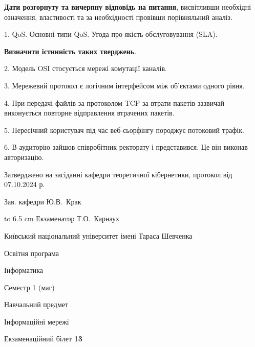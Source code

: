 \documentclass[12pt, ukrainian]{article}
\begin{document}
{
\qquad\textbf{Дати розгорнуту та вичерпну відповідь на питання}, висвітливши необхідні означення, властивості та за необхідності провівши порівняльний аналіз.

1. QoS. Основні типи QoS. Угода про якість обслуговування (SLA).



\qquad\textbf{Визначити істинність таких тверджень}.

2. Модель OSI стосується мережі комутації каналів.


3. Мережевий протокол є логічним інтерфейсом між об'єктами одного рівня.


4. При передачі файлів за протоколом TCP за втрати пакетів зазвичай виконується повторне відправлення втрачених пакетів.


5. Пересічний користувач під час веб-сьорфінгу породжує потоковий трафік.


6. В аудиторію зайшов співробітник ректорату і представився. Це він виконав авторизацію.

}
{\smallskip\smallskip \begin {scriptsize} Затверджено на засіданні кафедри теоретичної кібернетики, протокол   від   07.10.2024 р.\par\smallskip\smallskip\smallskip\smallskip
{\parbox {6.5 cm} {Зав. кафедри \dotfill Ю.В.~Крак}}\hspace {0.7cm} {\hbox to 6.5 cm { Екзаменатор \dotfill Т.О.~Карнаух}} \end{scriptsize}}
\newpage
{{\begin {scriptsize}\par
{ \center  Київський національний університет імені Тараса Шевченка \par}
{\parbox {5 cm}{Освітня програма \hfill}{\parbox {7 cm}{Інформатика\hfill}}\parbox {6 cm}{\hfill Семестр 1 (маг)}}\par
{\parbox {5 cm} {Навчальний предмет \hfill}\parbox {7 cm}{Інформаційні мережі \hfill}\parbox {6cm}{\hfill}\par}\vspace{-15pt} \end{scriptsize}}{\center Екзаменаційний білет \No \textbf { 13 }\par}}
\end{document}
